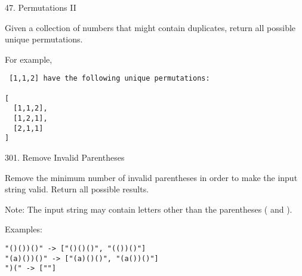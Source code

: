 \documentclass[../../question_3_array_question.tex]{subfiles}
\begin{document}
47. Permutations II

Given a collection of numbers that might contain duplicates, return all possible unique permutations.

For example,
\begin{lstlisting}
 [1,1,2] have the following unique permutations:

[
  [1,1,2],
  [1,2,1],
  [2,1,1]
]
\end{lstlisting}

301. Remove Invalid Parentheses

Remove the minimum number of invalid parentheses in order to make the input string valid. Return all possible results.

Note: The input string may contain letters other than the parentheses ( and ).

Examples:
\begin{lstlisting}
"()())()" -> ["()()()", "(())()"]
"(a)())()" -> ["(a)()()", "(a())()"]
")(" -> [""]
\end{lstlisting}
\end{document}
